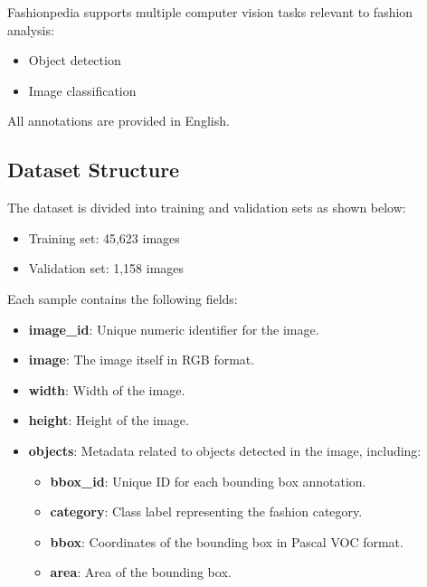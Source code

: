 Fashionpedia supports multiple computer vision tasks relevant to fashion analysis:

\vspace{-1.25em}
\begin{itemize}
    \setlength\itemsep{-1.5em}
    \item Object detection
    \item Image classification
\end{itemize}

All annotations are provided in English.

\subsection{Dataset Structure}

The dataset is divided into training and validation sets as shown below:

\vspace{-1.25em}
\begin{itemize}
    \setlength\itemsep{-1.5em}
    \item Training set: 45,623 images
    \item Validation set: 1,158 images
\end{itemize}

Each sample contains the following fields:

\vspace{-1.25em}
\begin{itemize}
    \setlength\itemsep{-1.5em}
    \item \textbf{image\_id}: Unique numeric identifier for the image.
    \item \textbf{image}: The image itself in RGB format.
    \item \textbf{width}: Width of the image.
    \item \textbf{height}: Height of the image.
    \item \textbf{objects}: Metadata related to objects detected in the image, including:
          \vspace{-1.25em}
          \begin{itemize}
              \setlength\itemsep{-1.5em}
              \item \textbf{bbox\_id}: Unique ID for each bounding box annotation.
              \item \textbf{category}: Class label representing the fashion category.
              \item \textbf{bbox}: Coordinates of the bounding box in Pascal VOC format.
              \item \textbf{area}: Area of the bounding box.
          \end{itemize}
\end{itemize}

